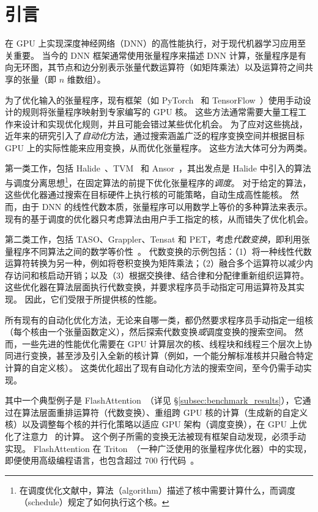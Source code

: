 \section{引言}
\label{sec:intro}

在 GPU 上实现深度神经网络（DNN）的高性能执行，对于现代机器学习应用至关重要。
当今的 DNN 框架通常使用张量程序来描述 DNN 计算，张量程序是有向无环图，其节点和边分别表示张量代数运算符（如矩阵乘法）以及运算符之间共享的张量（即 $n$ 维数组）。

为了优化输入的张量程序，现有框架（如 PyTorch~\cite{pytorch} 和 TensorFlow~\cite{Tensorflow}）使用手动设计的规则将张量程序映射到专家编写的 GPU 核。
这些方法通常需要大量工程工作来设计和实现优化规则，并且可能会错过某些优化机会。
为了应对这些挑战，近年来的研究引入了{\em 自动化}方法，通过搜索涵盖广泛的程序变换空间并根据目标 GPU 上的实际性能来应用变换，从而优化张量程序。
这些方法大体可分为两类。

第一类工作，包括 Halide~\cite{halide}、TVM~\cite{tvm} 和 Ansor~\cite{ansor}，其出发点是 Halide 中引入的算法与调度分离思想\footnote{在调度优化文献中，算法（algorithm）描述了核中需要计算什么，而调度（schedule）规定了如何执行这个核。}，在固定算法的前提下优化张量程序的{\em 调度}。
对于给定的算法，这些优化器通过搜索在目标硬件上执行核的可能策略，自动生成高性能核。
然而，由于 DNN 的线性代数本质，张量程序可以用数学上等价的多种算法来表示。现有的基于调度的优化器只考虑算法由用户手工指定的核，从而错失了优化机会。

第二类工作，包括 TASO、Grappler、Tensat 和 PET，考虑{\em 代数变换}，即利用张量程序不同算法之间的数学等价性~\cite{TASO, tensorflow_grappler, yang2021equality, wang2021pet}。
代数变换的示例包括：（1）将一种线性代数运算符转换为另一种，例如将卷积变换为矩阵乘法；（2）融合多个运算符以减少内存访问和核启动开销；以及（3）根据交换律、结合律和分配律重新组织运算符。
这些优化器在算法层面执行代数变换，并要求程序员手动指定可用运算符及其实现。
因此，它们受限于所提供核的性能。

所有现有的自动化优化方法，无论来自哪一类，都仍然要求程序员手动指定一组核（每个核由一个张量函数定义），然后探索代数变换{\em 或}调度变换的搜索空间。
然而，一些先进的性能优化需要在 GPU 计算层次的核、线程块和线程三个层次上协同进行变换，甚至涉及引入全新的核计算（例如，一个能分解标准核并只融合特定计算的自定义核）。
这类优化超出了现有自动化方法的搜索空间，至今仍需手动实现。

其中一个典型例子是 FlashAttention~\cite{dao2023flash}（详见 \S\ref{subsec:benchmark_results}），它通过在算法层面重排运算符（代数变换）、重组跨 GPU 核的计算（生成新的自定义核）以及调整每个核的并行化策略以适应 GPU 架构（调度变换），在 GPU 上优化了注意力~\cite{transformers} 的计算。
这个例子所需的变换无法被现有框架自动发现，必须手动实现。
FlashAttention 在 Triton~\cite{tillet2019triton}（一种广泛使用的张量程序优化器）中的实现，即便使用高级编程语言，也包含超过 700 行代码~\cite{triton-flashattention}。

